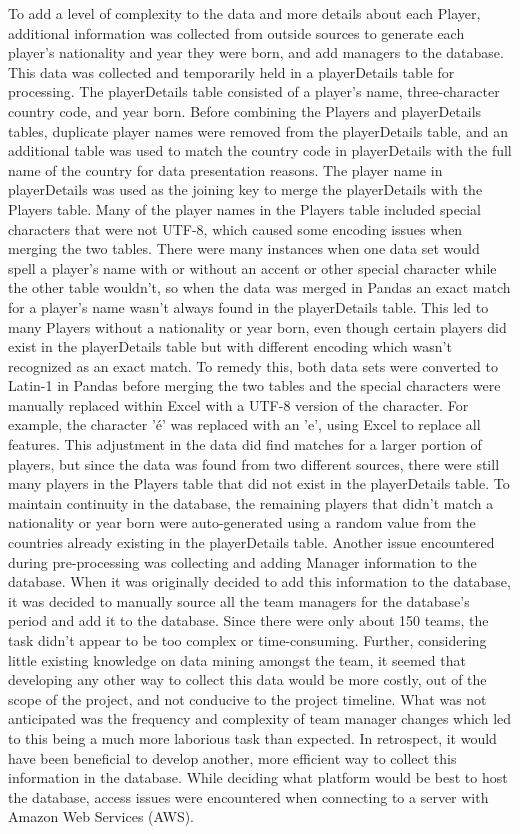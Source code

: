 To add a level of complexity to the data and more details about each Player, additional information was collected from outside sources to generate each player's nationality and year they were born, and add managers to the database. %
This data was collected and temporarily held in a playerDetails table for processing. The playerDetails table consisted of a player's name, three-character country code, and year born. Before combining the Players and playerDetails tables, duplicate player names were removed from the playerDetails table, and an additional table %
was used to match the country code in playerDetails with the full name of the country for data presentation reasons. The player name in playerDetails was used as the joining key to merge the playerDetails with the Players table. Many of the player names in the Players table included special characters that were not UTF-8, which caused some encoding issues when merging the two tables. There were many instances when one data set would spell a player's name with or without an accent or other special character while the other table wouldn't, so when the data was merged in Pandas an exact match for a player's name wasn't always found in the playerDetails table. This led to many Players without a nationality or year born, even though certain players did exist in the playerDetails table but with different encoding which wasn't recognized as an exact match. To remedy this, both data sets were converted to Latin-1 in Pandas before merging the two tables and the special characters were manually replaced within Excel with a UTF-8 version of the character. For example, the character '\'e' was replaced with an 'e', using Excel to replace all features. This adjustment in the data did find matches for a larger portion of players, but since the data was found from two different sources, there were still many players in the Players table that did not exist in the playerDetails table. To maintain continuity in the database, the remaining players that didn't match a nationality or year born were auto-generated using a random value from the countries already existing in the playerDetails table. Another issue encountered during pre-processing was collecting and adding Manager information to the database. When it was originally decided to add this information to the database, it was decided to manually source all the team managers for the database's period and add it to the database. Since there were only about 150 teams, the task didn't appear to be too complex or time-consuming. Further, considering little existing knowledge on data mining amongst the team, it seemed that developing any other way to collect this data would be more costly, out of the scope of the project, and not conducive to the project timeline. What was not anticipated was the frequency and complexity of team manager changes which led to this being a much more laborious task than expected. In retrospect, it would have been beneficial to develop another, more efficient way to collect this information in the database. While deciding what platform would be best to host the database, access issues were encountered when connecting to a server with Amazon Web Services (AWS).

